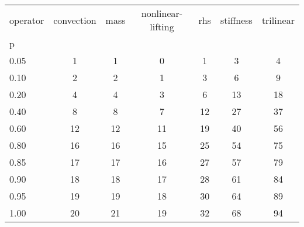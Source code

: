 \begin{tabular}{lcccccc}
\toprule
operator & convection & mass & nonlinear-lifting & rhs & stiffness & trilinear \\
p    &            &      &                   &     &           &           \\
\midrule
0.05 &          1 &    1 &                 0 &   1 &         3 &         4 \\
0.10 &          2 &    2 &                 1 &   3 &         6 &         9 \\
0.20 &          4 &    4 &                 3 &   6 &        13 &        18 \\
0.40 &          8 &    8 &                 7 &  12 &        27 &        37 \\
0.60 &         12 &   12 &                11 &  19 &        40 &        56 \\
0.80 &         16 &   16 &                15 &  25 &        54 &        75 \\
0.85 &         17 &   17 &                16 &  27 &        57 &        79 \\
0.90 &         18 &   18 &                17 &  28 &        61 &        84 \\
0.95 &         19 &   19 &                18 &  30 &        64 &        89 \\
1.00 &         20 &   21 &                19 &  32 &        68 &        94 \\
\bottomrule
\end{tabular}
